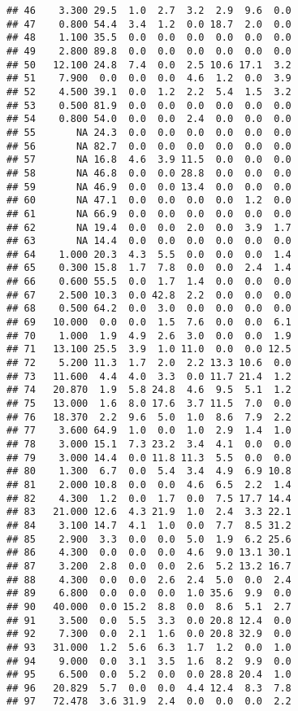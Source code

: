 \documentclass[
]{article}
\begin{document}
\begin{verbatim}
## 46    3.300 29.5  1.0  2.7  3.2  2.9  9.6  0.0
## 47    0.800 54.4  3.4  1.2  0.0 18.7  2.0  0.0
## 48    1.100 35.5  0.0  0.0  0.0  0.0  0.0  0.0
## 49    2.800 89.8  0.0  0.0  0.0  0.0  0.0  0.0
## 50   12.100 24.8  7.4  0.0  2.5 10.6 17.1  3.2
## 51    7.900  0.0  0.0  0.0  4.6  1.2  0.0  3.9
## 52    4.500 39.1  0.0  1.2  2.2  5.4  1.5  3.2
## 53    0.500 81.9  0.0  0.0  0.0  0.0  0.0  0.0
## 54    0.800 54.0  0.0  0.0  2.4  0.0  0.0  0.0
## 55       NA 24.3  0.0  0.0  0.0  0.0  0.0  0.0
## 56       NA 82.7  0.0  0.0  0.0  0.0  0.0  0.0
## 57       NA 16.8  4.6  3.9 11.5  0.0  0.0  0.0
## 58       NA 46.8  0.0  0.0 28.8  0.0  0.0  0.0
## 59       NA 46.9  0.0  0.0 13.4  0.0  0.0  0.0
## 60       NA 47.1  0.0  0.0  0.0  0.0  1.2  0.0
## 61       NA 66.9  0.0  0.0  0.0  0.0  0.0  0.0
## 62       NA 19.4  0.0  0.0  2.0  0.0  3.9  1.7
## 63       NA 14.4  0.0  0.0  0.0  0.0  0.0  0.0
## 64    1.000 20.3  4.3  5.5  0.0  0.0  0.0  1.4
## 65    0.300 15.8  1.7  7.8  0.0  0.0  2.4  1.4
## 66    0.600 55.5  0.0  1.7  1.4  0.0  0.0  0.0
## 67    2.500 10.3  0.0 42.8  2.2  0.0  0.0  0.0
## 68    0.500 64.2  0.0  3.0  0.0  0.0  0.0  0.0
## 69   10.000  0.0  0.0  1.5  7.6  0.0  0.0  6.1
## 70    1.000  1.9  4.9  2.6  3.0  0.0  0.0  1.9
## 71   13.100 25.5  3.9  1.0 11.0  0.0  0.0 12.5
## 72    5.200 11.3  1.7  2.0  2.2 13.3 10.6  0.0
## 73   11.600  4.4  4.0  3.3  0.0 11.7 21.4  1.2
## 74   20.870  1.9  5.8 24.8  4.6  9.5  5.1  1.2
## 75   13.000  1.6  8.0 17.6  3.7 11.5  7.0  0.0
## 76   18.370  2.2  9.6  5.0  1.0  8.6  7.9  2.2
## 77    3.600 64.9  1.0  0.0  1.0  2.9  1.4  1.0
## 78    3.000 15.1  7.3 23.2  3.4  4.1  0.0  0.0
## 79    3.000 14.4  0.0 11.8 11.3  5.5  0.0  0.0
## 80    1.300  6.7  0.0  5.4  3.4  4.9  6.9 10.8
## 81    2.000 10.8  0.0  0.0  4.6  6.5  2.2  1.4
## 82    4.300  1.2  0.0  1.7  0.0  7.5 17.7 14.4
## 83   21.000 12.6  4.3 21.9  1.0  2.4  3.3 22.1
## 84    3.100 14.7  4.1  1.0  0.0  7.7  8.5 31.2
## 85    2.900  3.3  0.0  0.0  5.0  1.9  6.2 25.6
## 86    4.300  0.0  0.0  0.0  4.6  9.0 13.1 30.1
## 87    3.200  2.8  0.0  0.0  2.6  5.2 13.2 16.7
## 88    4.300  0.0  0.0  2.6  2.4  5.0  0.0  2.4
## 89    6.800  0.0  0.0  0.0  1.0 35.6  9.9  0.0
## 90   40.000  0.0 15.2  8.8  0.0  8.6  5.1  2.7
## 91    3.500  0.0  5.5  3.3  0.0 20.8 12.4  0.0
## 92    7.300  0.0  2.1  1.6  0.0 20.8 32.9  0.0
## 93   31.000  1.2  5.6  6.3  1.7  1.2  0.0  1.0
## 94    9.000  0.0  3.1  3.5  1.6  8.2  9.9  0.0
## 95    6.500  0.0  5.2  0.0  0.0 28.8 20.4  1.0
## 96   20.829  5.7  0.0  0.0  4.4 12.4  8.3  7.8
## 97   72.478  3.6 31.9  2.4  0.0  0.0  0.0  2.2

\end{verbatim}
\end{document}

